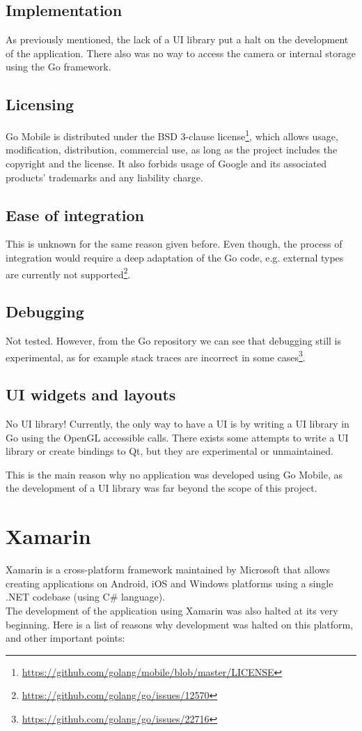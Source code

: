 \documentclass[11pt, a4paper, twoside, openright]{article} %
\begin{document}
{\subsection{Implementation}
As previously mentioned, the lack of a UI library put a halt on the development of the application. There also was no way to access the camera or internal storage using the Go framework. 

\subsection{Licensing}
Go Mobile is distributed under the BSD 3-clause  license\footnote{\url{https://github.com/golang/mobile/blob/master/LICENSE}}, which allows usage, modification, distribution, commercial use, as long as the project includes the copyright and the license. It also forbids usage of Google and its associated products' trademarks and any liability charge.

\subsection{Ease of integration}
This is unknown for the same reason given before. Even though, the process of integration would require a deep adaptation of the Go code, e.g. external types are currently not supported\footnote{\url{https://github.com/golang/go/issues/12570}}.

\subsection{Debugging}
Not tested. However, from the Go repository we can see that debugging still is experimental, as for example stack traces are incorrect in some cases\footnote{\url{https://github.com/golang/go/issues/22716}}.

\subsection{UI widgets and layouts}
No UI library! Currently, the only way to have a UI is by writing a UI library in Go using the OpenGL accessible calls. There exists some attempts to write a UI library or create bindings to Qt, but they are experimental or unmaintained.

This is the main reason why no application was developed using Go Mobile, as the development of a UI library was far beyond the scope of this project.

\newpage
\section{Xamarin}
Xamarin is a cross-platform framework maintained by Microsoft that allows creating applications on Android, iOS and Windows platforms using a single .NET codebase (using C\# language).\\
The development of the application using Xamarin was also halted at its very beginning. Here is a list of reasons why development was halted on this platform, and other important points:

}
\end{document}
